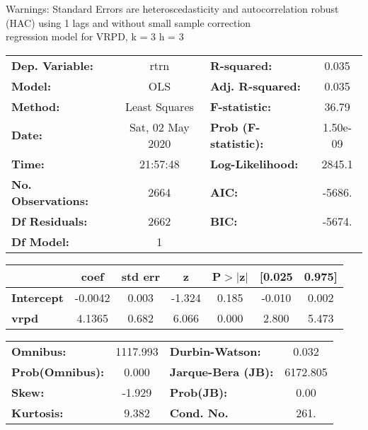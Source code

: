 Warnings: \newline
 [1] Standard Errors are heteroscedasticity and autocorrelation robust (HAC) using 1 lags and without small sample correction\\ 

regression model for VRPD, k = 3 h = 3\begin{center}
\begin{tabular}{lclc}
\toprule
\textbf{Dep. Variable:}    &       rtrn       & \textbf{  R-squared:         } &     0.035   \\
\textbf{Model:}            &       OLS        & \textbf{  Adj. R-squared:    } &     0.035   \\
\textbf{Method:}           &  Least Squares   & \textbf{  F-statistic:       } &     36.79   \\
\textbf{Date:}             & Sat, 02 May 2020 & \textbf{  Prob (F-statistic):} &  1.50e-09   \\
\textbf{Time:}             &     21:57:48     & \textbf{  Log-Likelihood:    } &    2845.1   \\
\textbf{No. Observations:} &        2664      & \textbf{  AIC:               } &    -5686.   \\
\textbf{Df Residuals:}     &        2662      & \textbf{  BIC:               } &    -5674.   \\
\textbf{Df Model:}         &           1      & \textbf{                     } &             \\
\bottomrule
\end{tabular}
\begin{tabular}{lcccccc}
                   & \textbf{coef} & \textbf{std err} & \textbf{z} & \textbf{P$> |$z$|$} & \textbf{[0.025} & \textbf{0.975]}  \\
\midrule
\textbf{Intercept} &      -0.0042  &        0.003     &    -1.324  &         0.185        &       -0.010    &        0.002     \\
\textbf{vrpd}      &       4.1365  &        0.682     &     6.066  &         0.000        &        2.800    &        5.473     \\
\bottomrule
\end{tabular}
\begin{tabular}{lclc}
\textbf{Omnibus:}       & 1117.993 & \textbf{  Durbin-Watson:     } &    0.032  \\
\textbf{Prob(Omnibus):} &   0.000  & \textbf{  Jarque-Bera (JB):  } & 6172.805  \\
\textbf{Skew:}          &  -1.929  & \textbf{  Prob(JB):          } &     0.00  \\
\textbf{Kurtosis:}      &   9.382  & \textbf{  Cond. No.          } &     261.  \\
\bottomrule
\end{tabular}
\end{center}

